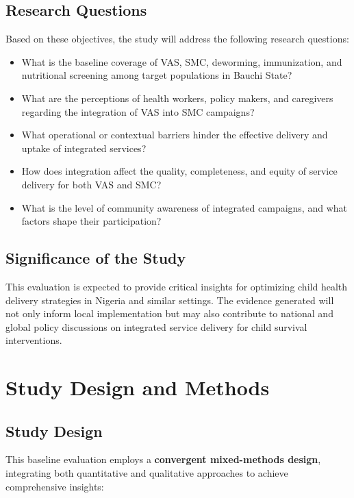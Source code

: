 \documentclass[
  11pt,
]{report}
\providecommand{\tightlist}{%
  \setlength{\itemsep}{0pt}\setlength{\parskip}{0pt}}
\begin{document}
\section{Research Questions}\label{research-questions}

Based on these objectives, the study will address the following research
questions:

\begin{itemize}
\tightlist
\item
  What is the baseline coverage of VAS, SMC, deworming, immunization,
  and nutritional screening among target populations in Bauchi State?
\item
  What are the perceptions of health workers, policy makers, and
  caregivers regarding the integration of VAS into SMC campaigns?
\item
  What operational or contextual barriers hinder the effective delivery
  and uptake of integrated services?
\item
  How does integration affect the quality, completeness, and equity of
  service delivery for both VAS and SMC?
\item
  What is the level of community awareness of integrated campaigns, and
  what factors shape their participation?
\end{itemize}

\section{Significance of the Study}\label{significance-of-the-study}

This evaluation is expected to provide critical insights for optimizing
child health delivery strategies in Nigeria and similar settings. The
evidence generated will not only inform local implementation but may
also contribute to national and global policy discussions on integrated
service delivery for child survival interventions.

\chapter{Study Design and Methods}\label{study-design-and-methods}

\section{Study Design}\label{study-design}

This baseline evaluation employs a \textbf{convergent mixed-methods
design}, integrating both quantitative and qualitative approaches to
achieve comprehensive insights:
\end{document}
